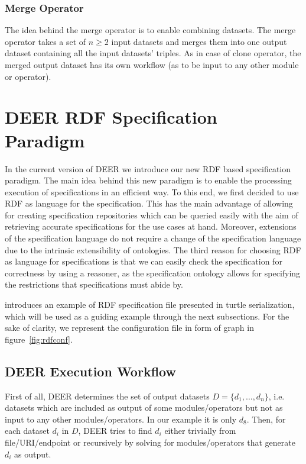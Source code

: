 \documentclass[a4paper,twoside,bibtotoc,abstracton,12pt,BCOR=15mm]{article}
\newcommand{\geolift}{\textsc{DEER}\xspace}
\begin{document}
\subsubsection{Merge Operator}
The idea behind the merge operator is to enable combining datasets.
The merge operator takes a set of $n \geq 2$ input datasets and merges them into one output dataset containing all the input datasets' triples.
As in case of clone operator, the merged output dataset has its own workflow (as to be input to any other module or operator).

\section{\geolift RDF Specification Paradigm}
In the current version of \geolift we introduce our new RDF based specification paradigm.
The main idea behind this new paradigm is to enable the processing execution of specifications in an efficient way.
To this end, we first decided to use RDF as language for the specification. This has the main advantage of allowing for creating specification repositories which can be queried easily with the aim of retrieving accurate specifications for the use cases at hand. Moreover, extensions of the specification language do not require a change of the specification language due to the intrinsic extensibility of ontologies. The third reason for choosing RDF as language for specifications is that we can easily check the specification for correctness by using a reasoner, as the specification ontology allows for specifying the restrictions that specifications must abide by.

introduces an example of RDF specification file presented in turtle serialization, which will be used as a guiding example through the next subsections.
For the sake of  clarity, we represent the configuration file in form of graph in figure~\ref{fig:rdfconf}.


\subsection{\geolift Execution Workflow}
First of all, \geolift determines the set of output datasets $D = \{d_1, \dots , d_n\}$, 
i.e. datasets which are included as output of some modules/operators but not as input to any other modules/operators.
In our example it is only $d_8$.
Then, for each dataset $d_i$ in $D$, \geolift tries to find $d_i$ either trivially from file/URI/endpoint or recursively by solving for modules/operators that generate $d_i$ as output.
\end{document}
